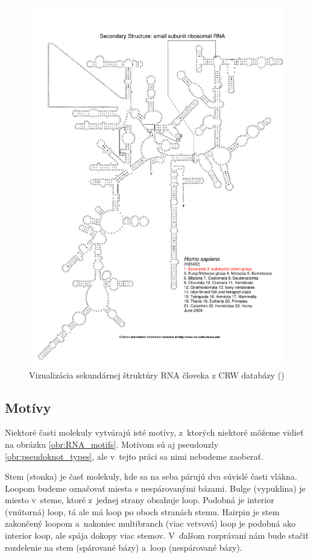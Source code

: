 \begin{figure}
  \includegraphics[width=1\textwidth]{../img/human_crw}
  \caption{Vizualizácia sekundárnej štruktúry RNA človeka z CRW databázy (\citet{CRW})}
  \label{obr:human_crw}
\end{figure}




\subsection{Motívy}

Niektoré časti molekuly vytvárajú isté motívy, z~ktorých niektoré môžeme
vidieť na obrázku \ref{obr:RNA_motifs}.
Motívom sú aj pseudouzly \ref{obr:pseudoknot_types}, ale v~tejto práci
sa nimi nebudeme zaoberať.

Stem (stonka) je časť molekuly, kde sa na seba párujú dva súvislé časti vlákna.
Loopom budeme označovať miesta s nespárovanými bázami.
Bulge (vypuklina) je miesto v~steme, ktoré z~jednej strany obsahuje loop.
Podobná je interior (vnútorná) loop, tá ale má loop po oboch stranách stemu.
Hairpin je stem zakončený loopom a~nakoniec multibranch (viac vetvová) loop
je podobná ako interior loop, ale spája dokopy viac stemov.
V~ďalšom rozprávaní nám bude stačiť rozdelenie na stem (spárované bázy)
a~loop (nespárované bázy).

